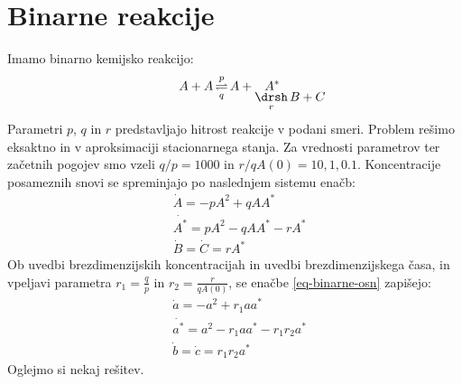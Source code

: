 \documentclass[slovene,11pt,a4paper]{article}
\numberwithin{equation}{section} %
\numberwithin{figure}{section} %
\numberwithin{table}{section} %
\begin{document}
\section{Binarne reakcije}
Imamo binarno kemijsko reakcijo:
\begin{equation*}
A+A \mathop{\rightleftharpoons}_{q}^{p} A+\underset{\displaystyle \mathop{\drsh}_r\rlap{\ensuremath{B+C}}}{A^\ast}
\end{equation*}
Parametri $p$, $q$ in $r$ predstavljajo hitrost reakcije v podani smeri. Problem rešimo eksaktno in v aproksimaciji stacionarnega stanja. Za vrednosti parametrov ter začetnih pogojev smo vzeli $q/p=1000$ in $r/q A(0)=10,1,0.1$. Koncentracije posameznih snovi se spreminjajo po naslednjem sistemu enačb:
\begin{equation}
\label{eq-binarne-osn}
\begin{aligned}
& \dot{A}=-pA^2 + qAA^* \\
& \dot{A^*}= pA^2 - qAA^*-rA^* \\
& \dot{B}= \dot{C}= rA^*
\end{aligned}
\end{equation}
Ob uvedbi brezdimenzijskih koncentracijah in uvedbi brezdimenzijskega časa, in vpeljavi parametra $r_1 =\frac{q}{p}$ in $r_2 =\frac{r}{q A(0)}$, se enačbe \ref{eq-binarne-osn} zapišejo:
\begin{equation}
\label{eq-binarne-brezdim}
\begin{aligned}
& \dot{a}=-a^2+r_1 aa^* \\
& \dot{a^*}= a^2 - r_1 aa^*- r_1 r_2a^* \\
& \dot{b}= \dot{c}= r_1 r_2a^*
\end{aligned}
\end{equation}
Oglejmo si nekaj rešitev.
\end{document}

